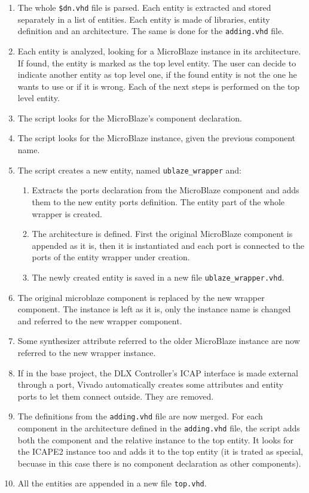 \begin{enumerate}
    \item The whole \texttt{\$dn.vhd} file is parsed. Each entity is extracted and stored separately in a list of entities. Each entity is made of libraries, entity definition and an architecture. The same is done for the \texttt{adding.vhd} file.
    \item Each entity is analyzed, looking for a MicroBlaze instance in its architecture. If found, the entity is marked as the top level entity. The user can decide to indicate another entity as top level one, if the found entity is not the one he wants to use or if it is wrong. Each of the next steps is performed on the top level entity.
    \item The script looks for the MicroBlaze's component declaration. 
    \item The script looks for the MicroBlaze instance, given the previous component name.
    \item The script creates a new entity, named \texttt{ublaze\_wrapper} and:
        \begin{enumerate}
        \item Extracts the ports declaration from the MicroBlaze component and adds them to the new entity ports definition. The entity part of the whole wrapper is created.
        \item The architecture is defined. First the original MicroBlaze component is appended as it is, then it is instantiated and each port is connected to the ports of the entity wrapper under creation.
        \item The newly created entity is saved in a new file \texttt{ublaze\_wrapper.vhd}.
        \end{enumerate}
    \item The original microblaze component is replaced by the new wrapper component. The instance is left as it is, only the instance name is changed and referred to the new wrapper component.
    \item Some synthesizer attribute referred to the older MicroBlaze instance are now referred to the new wrapper instance.
    \item If in the base project, the DLX Controller's ICAP interface is made external through a port, Vivado automatically creates some attributes and entity ports to let them connect outside. They are removed.
    \item The definitions from the \texttt{adding.vhd} file are now merged. For each component in the architecture defined in the \texttt{adding.vhd} file, the script adds both the component and the relative instance to the top entity. It looks for the ICAPE2 instance too and adds it to the top entity (it is trated as special, becuase in this case there is no component declaration as other components).
    \item All the entities are appended in a new file \texttt{top.vhd}.
\end{enumerate}


